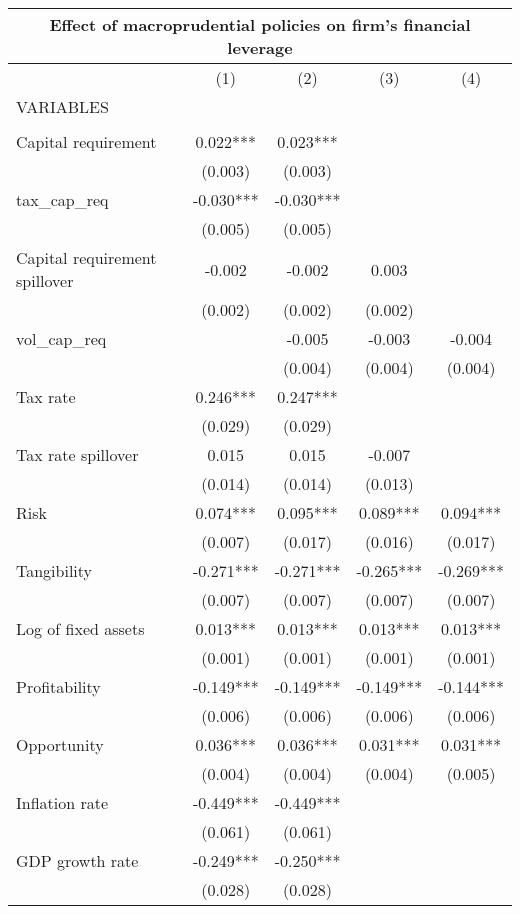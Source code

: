 \begin{tabular}{lcccc}
\multicolumn{5}{c}{Effect of macroprudential policies on firm's financial leverage} \\ \hline
 & (1) & (2) & (3) & (4) \\
VARIABLES &  &  &  &  \\ \hline
 &  &  &  &  \\
Capital requirement & 0.022*** & 0.023*** &  &  \\
 & (0.003) & (0.003) &  &  \\
tax\_cap\_req & -0.030*** & -0.030*** &  &  \\
 & (0.005) & (0.005) &  &  \\
Capital requirement spillover & -0.002 & -0.002 & 0.003 &  \\
 & (0.002) & (0.002) & (0.002) &  \\
vol\_cap\_req &  & -0.005 & -0.003 & -0.004 \\
 &  & (0.004) & (0.004) & (0.004) \\
Tax rate & 0.246*** & 0.247*** &  &  \\
 & (0.029) & (0.029) &  &  \\
Tax rate spillover & 0.015 & 0.015 & -0.007 &  \\
 & (0.014) & (0.014) & (0.013) &  \\
Risk & 0.074*** & 0.095*** & 0.089*** & 0.094*** \\
 & (0.007) & (0.017) & (0.016) & (0.017) \\
Tangibility & -0.271*** & -0.271*** & -0.265*** & -0.269*** \\
 & (0.007) & (0.007) & (0.007) & (0.007) \\
Log of fixed assets & 0.013*** & 0.013*** & 0.013*** & 0.013*** \\
 & (0.001) & (0.001) & (0.001) & (0.001) \\
Profitability & -0.149*** & -0.149*** & -0.149*** & -0.144*** \\
 & (0.006) & (0.006) & (0.006) & (0.006) \\
Opportunity & 0.036*** & 0.036*** & 0.031*** & 0.031*** \\
 & (0.004) & (0.004) & (0.004) & (0.005) \\
Inflation rate & -0.449*** & -0.449*** &  &  \\
 & (0.061) & (0.061) &  &  \\
GDP growth rate & -0.249*** & -0.250*** &  &  \\
 & (0.028) & (0.028) &  &  \\

\end{tabular}
